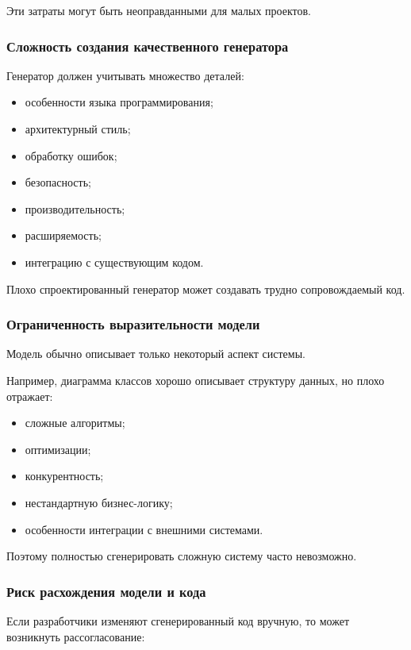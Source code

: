 \documentclass[12pt,a4paper]{article}
\begin{document}
Эти затраты могут быть неоправданными для малых проектов.

\subsubsection{Сложность создания качественного генератора}

Генератор должен учитывать множество деталей:

\begin{itemize}
    \item особенности языка программирования;
    \item архитектурный стиль;
    \item обработку ошибок;
    \item безопасность;
    \item производительность;
    \item расширяемость;
    \item интеграцию с существующим кодом.
\end{itemize}

Плохо спроектированный генератор может создавать трудно сопровождаемый код.

\subsubsection{Ограниченность выразительности модели}

Модель обычно описывает только некоторый аспект системы.

Например, диаграмма классов хорошо описывает структуру данных, но плохо отражает:

\begin{itemize}
    \item сложные алгоритмы;
    \item оптимизации;
    \item конкурентность;
    \item нестандартную бизнес-логику;
    \item особенности интеграции с внешними системами.
\end{itemize}

Поэтому полностью сгенерировать сложную систему часто невозможно.

\subsubsection{Риск расхождения модели и кода}

Если разработчики изменяют сгенерированный код вручную, то может возникнуть рассогласование:
\end{document}
